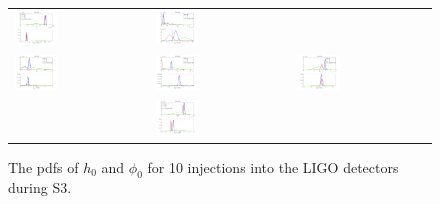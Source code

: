 \begin{figure}[!htbp]
\begin{tabular}{l l l}
\includegraphics[width=0.33\textwidth]{figs/S3PULSAR4} &
\includegraphics[width=0.33\textwidth]{figs/S3PULSAR5} \\
\includegraphics[width=0.33\textwidth]{figs/S3PULSAR6} &
\includegraphics[width=0.33\textwidth]{figs/S3PULSAR7} &
\includegraphics[width=0.33\textwidth]{figs/S3PULSAR8} \\
& \includegraphics[width=0.33\textwidth]{figs/S3PULSAR9} & \\
\end{tabular}
\caption{The pdfs of $h_0$ and $\phi_0$ for 10 injections into the LIGO detectors during
S3.}\label{S3PulsarInj}
\end{figure}

